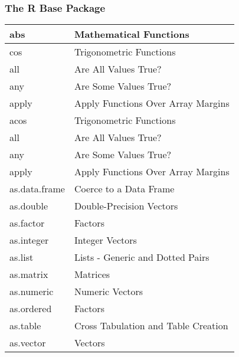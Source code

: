 \documentclass{beamer}
\begin{document}
\begin{frame}
    \frametitle{The R Base Package} 

{\scriptsize
\begin{center}
\begin{tabular}{|l|l|}
 \hline
abs & Mathematical Functions \\ \hline
cos &	Trigonometric Functions \\ \hline
all &	Are All Values True? \\ \hline
any &	Are Some Values True? \\ \hline
apply &	Apply Functions Over Array Margins \\ \hline
acos &	Trigonometric Functions \\ \hline
all &	Are All Values True? \\ \hline
any &	Are Some Values True? \\ \hline
apply &	Apply Functions Over Array Margins \\ \hline
as.data.frame &	Coerce to a Data Frame \\ \hline
as.double &	Double-Precision Vectors \\ \hline
as.factor &	Factors \\ \hline
as.integer	& Integer Vectors \\ \hline
as.list &	Lists - Generic and Dotted Pairs \\ \hline
as.matrix & Matrices \\ \hline
as.numeric &	Numeric Vectors \\ \hline
as.ordered &	Factors \\ \hline
as.table &	Cross Tabulation and Table Creation \\ \hline
as.vector	& Vectors \\ \hline
   \end{tabular}
 \end{center}
}

\end{frame}
\end{document}
